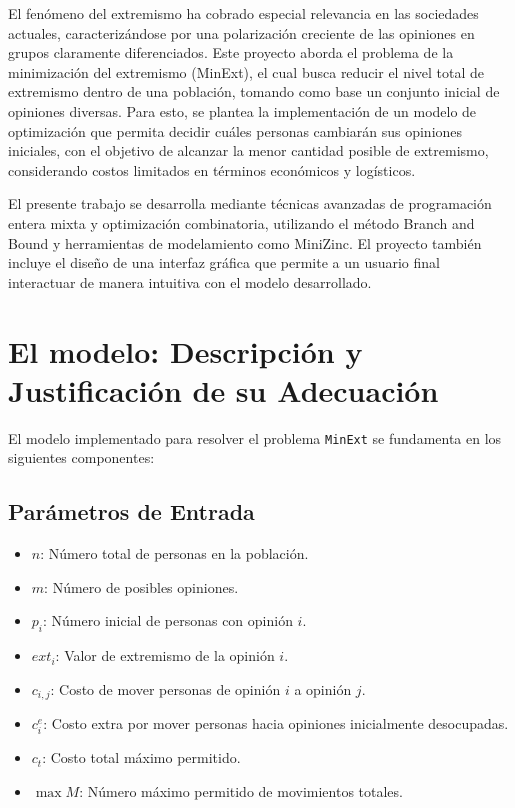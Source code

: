 \documentclass[11pt,letter]{article}
\begin{document}
El fenómeno del extremismo ha cobrado especial relevancia en las sociedades actuales, caracterizándose por una polarización creciente de las opiniones en grupos claramente diferenciados. Este proyecto aborda el problema de la minimización del extremismo (MinExt), el cual busca reducir el nivel total de extremismo dentro de una población, tomando como base un conjunto inicial de opiniones diversas. Para esto, se plantea la implementación de un modelo de optimización que permita decidir cuáles personas cambiarán sus opiniones iniciales, con el objetivo de alcanzar la menor cantidad posible de extremismo, considerando costos limitados en términos económicos y logísticos.

El presente trabajo se desarrolla mediante técnicas avanzadas de programación entera mixta y optimización combinatoria, utilizando el método Branch and Bound y herramientas de modelamiento como MiniZinc. El proyecto también incluye el diseño de una interfaz gráfica que permite a un usuario final interactuar de manera intuitiva con el modelo desarrollado.

\newpage


\newpage
\section{El modelo: Descripción y Justificación de su Adecuación}

El modelo implementado para resolver el problema \texttt{MinExt} se fundamenta en los siguientes componentes:

\subsection{Parámetros de Entrada}
\begin{itemize}
  \item $n$: Número total de personas en la población.
  \item $m$: Número de posibles opiniones.
  \item $p_i$: Número inicial de personas con opinión $i$.
  \item $\mathit{ext}_i$: Valor de extremismo de la opinión $i$.
  \item $c_{i,j}$: Costo de mover personas de opinión $i$ a opinión $j$.
  \item $c^e_i$: Costo extra por mover personas hacia opiniones inicialmente desocupadas.
  \item $c_t$: Costo total máximo permitido.
  \item $\max M$: Número máximo permitido de movimientos totales.
\end{itemize}
\end{document}
